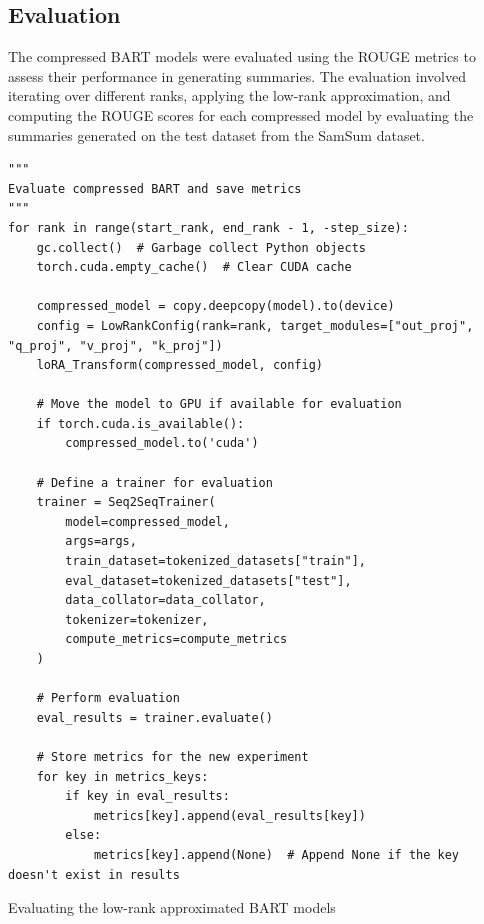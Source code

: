 \subsection{Evaluation}
The compressed BART models were evaluated using the ROUGE metrics to assess their performance in generating summaries. The evaluation involved iterating over different ranks, applying the low-rank approximation, and computing the ROUGE scores for each compressed model by evaluating the summaries generated on the test dataset from the SamSum dataset.
    \begin{listing}
\begin{verbatim}
"""
Evaluate compressed BART and save metrics
"""
for rank in range(start_rank, end_rank - 1, -step_size):
    gc.collect()  # Garbage collect Python objects
    torch.cuda.empty_cache()  # Clear CUDA cache

    compressed_model = copy.deepcopy(model).to(device)
    config = LowRankConfig(rank=rank, target_modules=["out_proj", "q_proj", "v_proj", "k_proj"])
    loRA_Transform(compressed_model, config)

    # Move the model to GPU if available for evaluation
    if torch.cuda.is_available():
        compressed_model.to('cuda')

    # Define a trainer for evaluation
    trainer = Seq2SeqTrainer(
        model=compressed_model,
        args=args,
        train_dataset=tokenized_datasets["train"],
        eval_dataset=tokenized_datasets["test"],
        data_collator=data_collator,
        tokenizer=tokenizer,
        compute_metrics=compute_metrics
    )

    # Perform evaluation
    eval_results = trainer.evaluate()

    # Store metrics for the new experiment
    for key in metrics_keys:
        if key in eval_results:
            metrics[key].append(eval_results[key])
        else:
            metrics[key].append(None)  # Append None if the key doesn't exist in results
\end{verbatim}
    \caption{Evaluating the low-rank approximated BART models}
    \label{listing:ROUGE_Evaluation}
    \end{listing}
